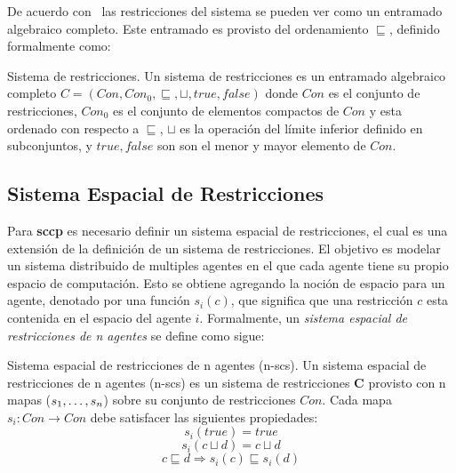De acuerdo con~\cite{DEBOER199537} las restricciones del sistema se pueden ver como un entramado algebraico completo. Este entramado es provisto del ordenamiento $\sqsubseteq$, definido formalmente como:

\theoremstyle{definition}
\begin{definition}{Sistema de restricciones.}
Un sistema de restricciones es un entramado algebraico completo $C = (Con, Con_0, \sqsubseteq, \sqcup, true, false)$ donde $Con$ es el conjunto de restricciones, $Con_0$ es el conjunto de elementos compactos de $Con$ y esta ordenado con respecto a $\sqsubseteq$, $\sqcup$ es la operaci\'on del l\'imite inferior definido en subconjuntos, y $true, false$ son son el menor y mayor elemento de $Con$.
\end{definition}

\subsection{Sistema Espacial de Restricciones}
\label{ser.cap3}

Para \textbf{sccp} es necesario definir un sistema espacial de restricciones, el cual es una extensi\'on de la definici\'on de un sistema de restricciones. El objetivo es modelar un sistema distribuido de multiples agentes en el que cada agente tiene su propio espacio de computaci\'on. Esto se obtiene agregando la noci\'on de espacio para un agente, denotado por una funci\'on $s_i(c)$, que significa que una restricci\'on $c$ esta contenida en el espacio del agente $i$. Formalmente, un \textit{sistema espacial de restricciones de n agentes} se define como sigue:

\theoremstyle{definition}
\begin{definition}{Sistema espacial de restricciones de n agentes (n-scs).}
Un sistema espacial de restricciones de n agentes (n-scs) es un sistema de restricciones \textbf{C} provisto con n mapas ($s_1, \mathellipsis,s_n$) sobre su conjunto de restricciones $Con$.  Cada mapa $s_i: Con \rightarrow Con$ debe satisfacer las siguientes propiedades:
\begin{equation} \label{n-scs.eq1}	
s_i(true)=true 
\end{equation}
\begin{equation} \label{n-scs.eq2}
s_i(c\sqcup d)=c\sqcup d
\end{equation}
\begin{equation} \label{n-scs.eq3}
c \sqsubseteq d \Rightarrow s_i(c) \sqsubseteq s_i(d)
\end{equation}
\end{definition}


